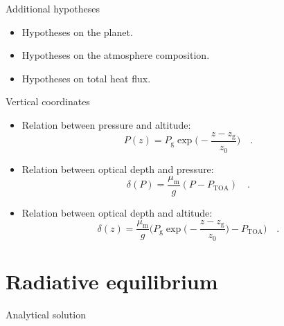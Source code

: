 \documentclass[aspectratio=43]{beamer}
\newcommand{\PTOA}{P_\text{TOA}}
\begin{document}
\begin{frame}{Additional hypotheses}
  \begin{itemize}
    \item<1-> Hypotheses on the planet.
    \item<2-> Hypotheses on the atmosphere composition.
    \item<3-> Hypotheses on total heat flux.
  \end{itemize}
\end{frame}

\begin{frame}{Vertical coordinates}
  \begin{itemize}
    \item Relation between pressure and altitude:
      \begin{equation}
        \label{eq:pressure_altitude}
        P(z) = P_\text{g} \exp{\bigg( - \frac{z - z_\text{g}}{z_0} \bigg)}
        \quad .
      \end{equation}
    \item Relation between optical depth and pressure:
      \begin{equation}
        \label{eq:optical_depth_pressure}
        \delta(P) = \frac{\mu_\text{m}}{g} (P - \PTOA)
        \quad .
      \end{equation}
    \item Relation between optical depth and altitude:
      \begin{equation}
        \label{eq:optical_depth_altitude_2}
        \delta(z) = \frac{\mu_\text{m}}{g} \bigg( P_\text{g} \exp{\bigg( - \frac{z - z_\text{g}}{z_0} \bigg)} - \PTOA \bigg)
        \quad .
      \end{equation}
  \end{itemize}
\end{frame}



\section{Radiative equilibrium}
\begin{frame}{Analytical solution}
\end{frame}
\end{document}
